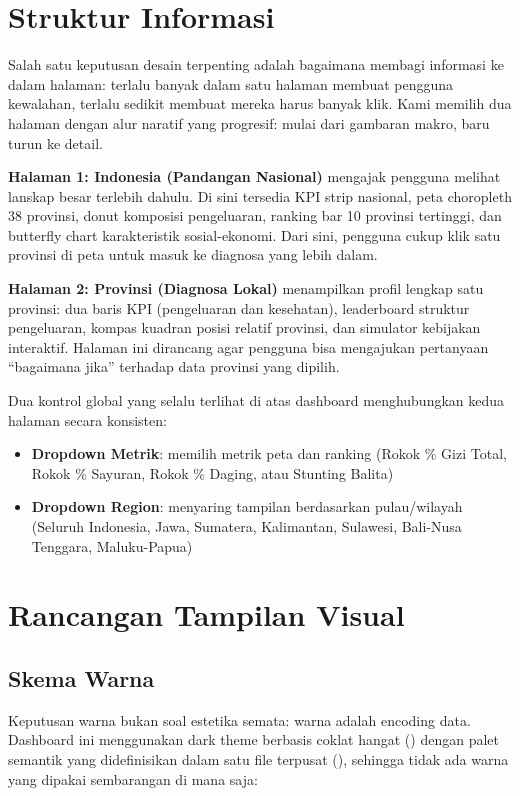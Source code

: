 \section{Struktur Informasi}

Salah satu keputusan desain terpenting adalah bagaimana membagi informasi ke dalam halaman: terlalu banyak dalam satu halaman membuat pengguna kewalahan, terlalu sedikit membuat mereka harus banyak klik. Kami memilih dua halaman dengan alur naratif yang progresif: mulai dari gambaran makro, baru turun ke detail.

\textbf{Halaman 1: Indonesia (Pandangan Nasional)} mengajak pengguna melihat lanskap besar terlebih dahulu. Di sini tersedia KPI strip nasional, peta choropleth 38 provinsi, donut komposisi pengeluaran, ranking bar 10 provinsi tertinggi, dan butterfly chart karakteristik sosial-ekonomi. Dari sini, pengguna cukup klik satu provinsi di peta untuk masuk ke diagnosa yang lebih dalam.

\textbf{Halaman 2: Provinsi (Diagnosa Lokal)} menampilkan profil lengkap satu provinsi: dua baris KPI (pengeluaran dan kesehatan), leaderboard struktur pengeluaran, kompas kuadran posisi relatif provinsi, dan simulator kebijakan interaktif. Halaman ini dirancang agar pengguna bisa mengajukan pertanyaan ``bagaimana jika'' terhadap data provinsi yang dipilih.

Dua kontrol global yang selalu terlihat di atas dashboard menghubungkan kedua halaman secara konsisten:
\begin{itemize}
  \item \textbf{Dropdown Metrik}: memilih metrik peta dan ranking (Rokok \% Gizi Total, Rokok \% Sayuran, Rokok \% Daging, atau Stunting Balita)
  \item \textbf{Dropdown Region}: menyaring tampilan berdasarkan pulau/wilayah (Seluruh Indonesia, Jawa, Sumatera, Kalimantan, Sulawesi, Bali-Nusa Tenggara, Maluku-Papua)
\end{itemize}

\section{Rancangan Tampilan Visual}

\subsection{Skema Warna}

Keputusan warna bukan soal estetika semata: warna adalah encoding data. Dashboard ini menggunakan dark theme berbasis coklat hangat () dengan palet semantik yang didefinisikan dalam satu file terpusat (), sehingga tidak ada warna yang dipakai sembarangan di mana saja:

